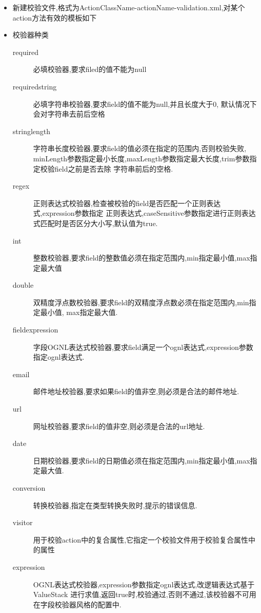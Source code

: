 \begin{itemize}
\begin{itemize}
\begin{lstlisting}[style=JAVA]
<validators>
	<field name="username">
		<field-validator type="requiredstring">
			<param name="trim">true</param>
			<message>用户名不能为空!</message>
		</field-validator>
	</field>
	<field name="password">
		<field-validator type="requiredstring">
			<message>密码不能为空!</message>
		</field-validator>
		
		<field-validator type="stringlength">
			<!--指定user属性最小长度-->
        	<param name="minLength">4</param>
			<message>密码长度要大于4!</message>
		</field-validator>
	</field>
</validators>
\end{lstlisting}
\item 新建校验文件,格式为ActionClassName-actionName-validation.xml,对某个action方法有效的模板如下
\item 校验器种类
\begin{description}
\item[required] 必填校验器,要求filed的值不能为null
\item[requiredstring]	必填字符串校验器,要求field的值不能为null,并且长度大于0,
默认情况下会对字符串去前后空格
\item[stringlength]	字符串长度校验器,要求field的值必须在指定的范围内,否则校验失败,
minLength参数指定最小长度,maxLength参数指定最大长度,trim参数指定校验field之前是否去除
字符串前后的空格.
\item[regex]		正则表达式校验器,检查被校验的field是否匹配一个正则表达式,expression参数指定
正则表达式,caseSensitive参数指定进行正则表达式匹配时是否区分大小写,默认值为true.
\item[int]	整数校验器,要求field的整数值必须在指定范围内,min指定最小值,max指定最大值
\item[double]	双精度浮点数校验器,要求field的双精度浮点数必须在指定范围内,min指定最小值,
max指定最大值.
\item[fieldexpression]	字段OGNL表达式校验器,要求field满足一个ognl表达式,expression参数
指定ognl表达式.
\item[email]		邮件地址校验器,要求如果field的值非空,则必须是合法的邮件地址.
\item[url]	网址校验器,要求field的值非空,则必须是合法的url地址.
\item[date]	日期校验器,要求field的日期值必须在指定范围内,min指定最小值,max指定最大值.
\item[conversion]	转换校验器,指定在类型转换失败时,提示的错误信息.
\item[visitor]	用于校验action中的复合属性,它指定一个校验文件用于校验复合属性中的属性
\item[expression]	OGNL表达式校验器,expression参数指定ognl表达式,改逻辑表达式基于ValueStack
进行求值,返回true时,校验通过,否则不通过,该校验器不可用在字段校验器风格的配置中.
\end{description}


\end{itemize}
\end{itemize}
